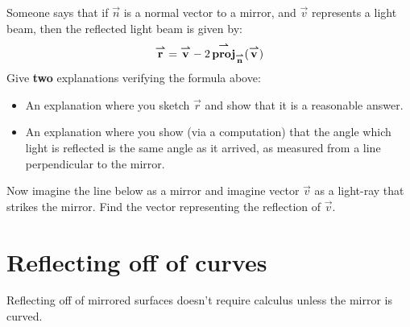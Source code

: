 \documentclass[handout,noauthor,nooutcomes]{ximera}
\begin{document}
\begin{problem}
  Someone says that if $\vec{n}$ is a normal vector to a mirror, and
  $\vec{v}$ represents a light beam, then the reflected light beam is
  given by:
  \[
  {\overset{\boldsymbol{\rightharpoonup}}{\mathbf{r}}}={\overset{\boldsymbol{\rightharpoonup}}{\mathbf{v}}} - 2\operatorname{{\overset{\boldsymbol{\rightharpoonup}}{\mathbf{proj}}}}_{{\overset{\boldsymbol{\rightharpoonup}}{\mathbf{n}}}}({\overset{\boldsymbol{\rightharpoonup}}{\mathbf{v}}})
  \]
  Give \textbf{two} explanations verifying the formula above:
  \begin{itemize}
  \item An explanation where you sketch $\vec{r}$ and show that it is
    a reasonable answer.
  \item An explanation where you show (via a computation) that the
    angle which light is reflected is the same angle as it arrived, as
    measured from a line perpendicular to the mirror.
  \end{itemize}
\end{problem}




\begin{problem}
  Now imagine the line below as a mirror and imagine vector $\vec{v}$
  as a light-ray that strikes the mirror. Find the vector representing
  the reflection of $\vec{v}$.
  \begin{image}
\end{image}
\end{problem}


\section{Reflecting off of curves}

Reflecting off of mirrored surfaces doesn't require calculus unless
the mirror is curved. 
\end{document}
